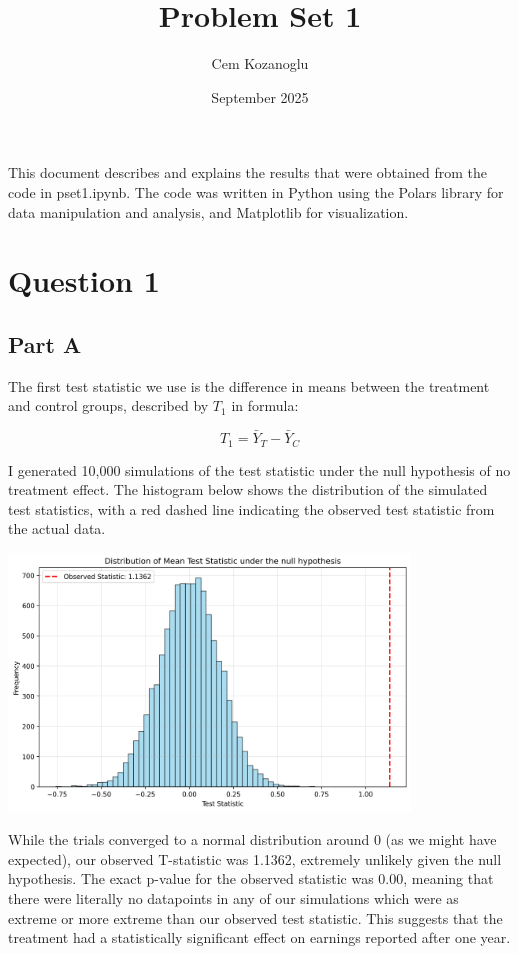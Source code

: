 \documentclass[12pt]{article}
\title{\vspace{-4em}Problem Set 1}
\author{Cem Kozanoglu}
\date{September 2025}
\begin{document}
\maketitle

This document describes and explains the results that were obtained from the code in pset1.ipynb. The code was written in Python using the Polars library for data manipulation and analysis, and Matplotlib for visualization.

\section{Question 1}

\subsection{Part A}

The first test statistic we use is the difference in means between the treatment and control groups, described by $T_1$ in formula:

\[T_1 = \bar{Y}_T - \bar{Y}_C\]

I generated 10,000 simulations of the test statistic under the null hypothesis of no treatment effect. The histogram below shows the distribution of the simulated test statistics, with a red dashed line indicating the observed test statistic from the actual data.

\vspace*{2em}
\includegraphics[width=0.8\textwidth]{stat1_graph.png}
\vspace*{2em}

While the trials converged to a normal distribution around 0 (as we might have expected), our observed T-statistic was 1.1362, extremely unlikely given the null hypothesis. The exact p-value for the observed statistic was 0.00, meaning that there were literally no datapoints in any of our simulations which were as extreme or more extreme than our observed test statistic. This suggests that the treatment had a statistically significant effect on earnings reported after one year.
\end{document}
